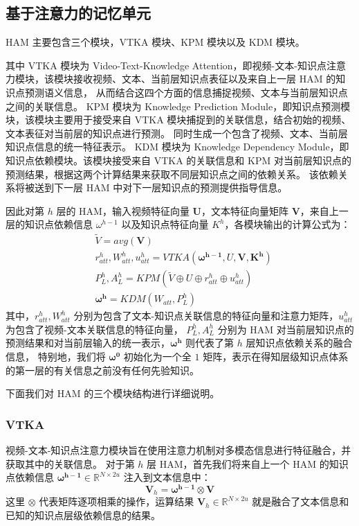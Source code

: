 \subsection{基于注意力的记忆单元}
    HAM 主要包含三个模块，VTKA 模块、KPM 模块以及 KDM 模块。

    其中 VTKA 模块为 Video-Text-Knowledge Attention，即视频-文本-知识点注意力模块，该模块接收视频、文本、当前层知识点表征以及来自上一层 HAM 的知识点预测语义信息，
    从而结合这四个方面的信息捕捉视频、文本与当前层知识点之间的关联信息。
    KPM 模块为 Knowledge Prediction Module，即知识点预测模块，该模块主要用于接受来自 VTKA 模块捕捉到的关联信息，结合初始的视频、文本表征对当前层的知识点进行预测。
    同时生成一个包含了视频、文本、当前层知识点信息的统一特征表示。
    KDM 模块为 Knowledge Dependency Module，即知识点依赖模块。该模块接受来自 VTKA 的关联信息和 KPM 对当前层知识点的预测结果，根据这两个计算结果来获取不同层知识点之间的依赖关系。
    该依赖关系将被送到下一层 HAM 中对下一层知识点的预测提供指导信息。

    因此对第 $h$ 层的 HAM，输入视频特征向量 $\boldsymbol{U}$，文本特征向量矩阵 $\boldsymbol{V}$，来自上一层的知识点依赖信息 $\omega^{h - 1}$ 以及知识点特征向量 $K^h$，各模块输出的计算公式为：
    \begin{equation}
        \begin{aligned}
            &\tilde{V} = avg(\boldsymbol{V}) \\
            &r_{att}^h, W_{att}^h, u_{att}^h = VTKA(\boldsymbol{\omega^{h - 1}}, U, \boldsymbol{V}, \boldsymbol{K^h}) \\
            &P_L^h, A_L^h = KPM(\tilde{V} \oplus U \oplus r_{att}^h \oplus u_{att}^h) \\
            &\boldsymbol{\omega^h} = KDM(W_{att}, P_L^h)
        \end{aligned}
    \end{equation}
    其中，$r_{att}^{h}, W_{att}^h$ 分别为包含了文本-知识点关联信息的特征向量和注意力矩阵，$u_{att}^h$ 为包含了视频-文本关联信息的特征向量，
    $P_L^h, A_L^h$ 分别为 HAM 对当前层知识点的预测结果和对当前层输入的统一表示，$\boldsymbol{\omega^h}$ 则代表了第 $h$ 层知识点依赖关系的融合信息，
    特别地，我们将 $\boldsymbol{\omega^0}$ 初始化为一个全 $1$ 矩阵，表示在得知层级知识点体系的第一层的有关信息之前没有任何先验知识。

    下面我们对 HAM 的三个模块结构进行详细说明。

    \subsubsection{VTKA}
    视频-文本-知识点注意力模块旨在使用注意力机制对多模态信息进行特征融合，并获取其中的关联信息。
    对于第 $h$ 层 HAM，首先我们将来自上一个 HAM 的知识点依赖信息 $\boldsymbol{\omega^{h - 1}} \in \mathbb{R}^{N \times 2u}$ 注入到文本信息中：
    \begin{equation}
        \boldsymbol{V}_h = \boldsymbol{\omega^{h - 1}} \otimes \boldsymbol{V}
    \end{equation}
    这里 $\otimes$ 代表矩阵逐项相乘的操作，运算结果 $\boldsymbol{V}_h \in \mathbb{R}^{N \times 2u}$ 就是融合了文本信息和已知的知识点层级依赖信息的结果。

